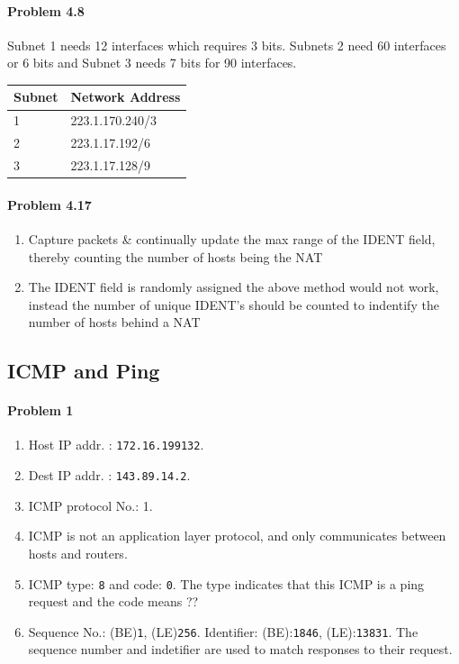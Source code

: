 \documentclass[12pt]{article}
\begin{document}
\paragraph{Problem 4.8 }
Subnet 1 needs 12 interfaces which requires 3 bits. Subnets 2 need 60 interfaces or 6 bits and Subnet 3 needs 7 bits for 90 interfaces.
\\
\begin{center}
\begin{tabular}{ | l | l | }
	\hline
	Subnet & Network Address \\ \hline
	1 & 223.1.170.240/3 \\ \hline
	2 & 223.1.17.192/6 \\ \hline
	3 & 223.1.17.128/9 \\ \hline
\end{tabular}
\end{center}

\paragraph{Problem 4.17}
\begin{enumerate}[label=\textbf{Part \alph*)}, leftmargin=*, align=left]
	\item Capture packets \& continually update the max range of the IDENT field, thereby counting the number of hosts being the NAT
	\item The IDENT field is randomly assigned the above method would not work, instead the number of unique IDENT's should be counted to indentify the number of hosts behind a NAT
\end{enumerate}

\setcounter{subsection}{1}
\subsection{ICMP and Ping}
\paragraph{Problem 1}
\begin{enumerate}[label=\textbf{Part \alph*)}, leftmargin=*, align=left]
	\item Host IP addr. : \texttt{172.16.199132}.
	\item Dest IP addr. : \texttt{143.89.14.2}.
	\item ICMP protocol No.: 1.
	\item ICMP is not an application layer protocol, and only communicates between hosts and routers. 
	\item ICMP type: \texttt{8} and code: \texttt{0}. The type indicates that this ICMP is a ping request and the code means ??
	\item Sequence No.: (BE)\texttt{1}, (LE)\texttt{256}. Identifier: (BE):\texttt{1846}, (LE):\texttt{13831}. The sequence number and indetifier are used to match responses to their request.
\end{enumerate}
\end{document}
